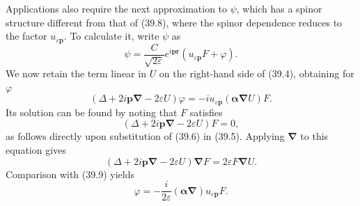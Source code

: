 Applications also require the next approximation to $\psi$, which has a spinor structure different from that of (39.8), where the spinor dependence reduces to the factor $u_{\varepsilon\mathbf p}$. To calculate it, write $\psi$ as
\[
\psi=\frac C{\sqrt{2\varepsilon}}e^{i\mathbf p\mathbf r}
(u_{\varepsilon\mathbf p}F+\varphi).
\]
We now retain the term linear in $U$ on the right-hand side of (39.4), obtaining for $\varphi$
\begin{equation}
(\Delta+2i\mathbf p\boldsymbol\nabla-2\varepsilon U)\varphi
=-iu_{\varepsilon\mathbf p}(\boldsymbol\alpha\boldsymbol\nabla U)F.
\tag{39.9}
\end{equation}
Its solution can be found by noting that $F$ satisfies
\[
(\Delta+2i\mathbf p\boldsymbol\nabla-2\varepsilon U)F=0,
\]
as follows directly upon substitution of (39.6) in (39.5). Applying $\boldsymbol\nabla$ to this equation gives
\[
(\Delta+2i\mathbf p\boldsymbol\nabla-2\varepsilon U)\boldsymbol\nabla F
=2\varepsilon F\boldsymbol\nabla U.
\]
Comparison with (39.9) yields
\[
\varphi=-\frac i{2\varepsilon}(\boldsymbol\alpha\boldsymbol\nabla)
u_{\varepsilon\mathbf p}F.
\]

